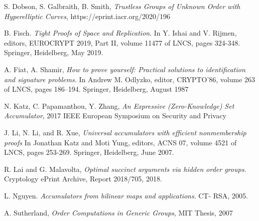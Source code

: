 \documentclass[11pt, lettersize, notitlepage, leqno, footskip=0.6cm]{article}
\newcommand{\noin}{\noindent}
\numberwithin{equation}{section}
\begin{document}
\noindent [DGS20] S. Dobson, S. Galbraith, B. Smith, \textit{Trustless Groups of Unknown Order with Hyperelliptic Curves}, https://eprint.iacr.org/2020/196\vspace{0.1cm}

\noin [Fis18] B. Fisch. \textit{Tight Proofs of Space and Replication}. In Y. Ishai and V. Rijmen, editors, EUROCRYPT 2019, Part II, volume 11477 of LNCS, pages 324-348. Springer, Heidelberg, May 2019.

\noindent [FS87] A. Fiat, A. Shamir, \textit{How to prove yourself: Practical solutions to identification and signature problems.} In Andrew M. Odlyzko, editor, CRYPTO’86, volume 263 of LNCS, pages 186–194. Springer, Heidelberg, August 1987\vspace{0.1cm}

\noin [KPZ17] N. Katz, C. Papamanthou, Y. Zhang, \textit{An Expressive (Zero-Knowledge) Set Accumulator}, 2017 IEEE European Symposium on Security and Privacy


\noin [LLX07] J. Li, N. Li, and R. Xue,  \textit{Universal accumulators with efficient nonmembership proofs} In Jonathan Katz and Moti Yung, editors, ACNS 07, volume 4521 of LNCS, pages 253-269. Springer, Heidelberg, June 2007.

\noin [LM18] R. Lai and G. Malavolta,  \textit{Optimal succinct arguments
via hidden order groups}. Cryptology ePrint Archive, Report 2018/705,
2018.

\noin [Ngu05] L. Nguyen. \textit{Accumulators from bilinear maps and applications}. CT-
RSA, 2005. \vspace{0.1cm}

\noindent [Sut07] A. Sutherland, \textit{Order Computations in Generic Groups}, MIT Thesis, 2007 \vspace{0.1cm}
\end{document}
